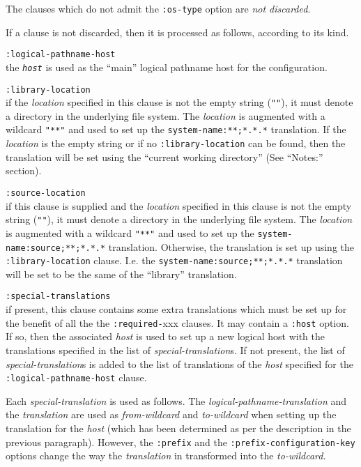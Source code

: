 \documentclass{article}
\newcommand{\code}[1]{\texttt{#1}}
\newcommand{\clhsterm}[1]{\texttt{\textit{#1}}} %
\begin{document}
The clauses which do not admit the \code{:os-type} option are
\emph{not discarded}.

If a clause is not discarded, then it is processed as follows,
according to its kind.
\begin{description}
\item	\code{:logical-pathname-host}\\
	the \clhsterm{host} is used as the ``main'' logical pathname
	host for the configuration.

\item	\code{:library-location}\\
	if the \emph{location} specified in this clause is not the
	empty string (\code{""}), it must denote a
	directory in the underlying file system. The \emph{location}
	is augmented with a wildcard \code{"**"} and used to set up
	the \code{system-name:**;*.*.*} translation. If the
	\emph{location} is the empty string or if no
	\code{:library-location} can be found, then the translation
	will be set using the ``current working directory'' (See
	``Notes:'' section).

\item	\code{:source-location}\\
	if this clause is supplied and the \emph{location} specified
	in this clause is not the 
	empty string (\code{""}), it must denote a
	directory in the underlying file system. The \emph{location}
	is augmented with a wildcard \code{"**"} and used to set up
	the \code{system-name:source;**;*.*.*} translation. Otherwise,
	the translation is set up using the
	\code{:library-location} clause. I.e. the
	\code{system-name:source;**;*.*.*} translation will be set to
	be the same of the ``library'' translation.

\item	\code{:special-translations}\\
	if present, this clause contains some extra translations which
	must be set up for the benefit of all the the
	\code{:required-}xxx clauses.
	It may contain a \code{:host} option. If so, then the
	associated \emph{host} is used to set up a new logical host
	with the translations specified in the list of
	\emph{special-translation}s.  If not present, the list of
	\emph{special-translation}s is added to the list of
	translations of the \emph{host} specified for the
	\code{:logical-pathname-host} clause.

	Each \emph{special-translation} is used as follows. The
	\emph{logical-pathname-translation} and the \emph{translation}
	are used as \emph{from-wildcard} and \emph{to-wildcard} when
	setting up the translation for the \emph{host} (which has been
	determined as per the description in the previous paragraph).
	However, the \code{:prefix} and the
	\code{:prefix-configuration-key} options change the way the
	\emph{translation} in transformed into the \emph{to-wildcard}.


\end{description}
\end{document}

